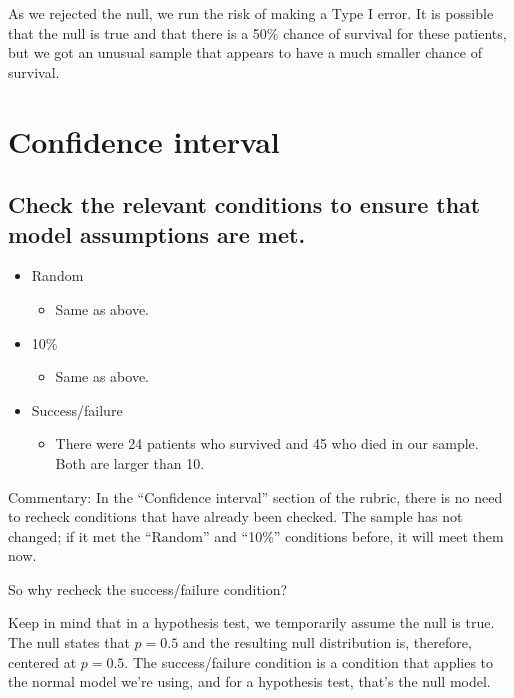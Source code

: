 \documentclass[
]{book}
\providecommand{\tightlist}{%
  \setlength{\itemsep}{0pt}\setlength{\parskip}{0pt}}
\begin{document}
As we rejected the null, we run the risk of making a Type I error. It is possible that the null is true and that there is a 50\% chance of survival for these patients, but we got an unusual sample that appears to have a much smaller chance of survival.

\hypertarget{one-prop-ex-ci}{%
\section{Confidence interval}\label{one-prop-ex-ci}}

\hypertarget{one-prop-ex-ci-conditions}{%
\subsection{Check the relevant conditions to ensure that model assumptions are met.}\label{one-prop-ex-ci-conditions}}

\begin{itemize}
\tightlist
\item
  Random

  \begin{itemize}
  \tightlist
  \item
    Same as above.
  \end{itemize}
\item
  10\%

  \begin{itemize}
  \tightlist
  \item
    Same as above.
  \end{itemize}
\item
  Success/failure

  \begin{itemize}
  \tightlist
  \item
    There were 24 patients who survived and 45 who died in our sample. Both are larger than 10.
  \end{itemize}
\end{itemize}

Commentary: In the ``Confidence interval'' section of the rubric, there is no need to recheck conditions that have already been checked. The sample has not changed; if it met the ``Random'' and ``10\%'' conditions before, it will meet them now.

So why recheck the success/failure condition?

Keep in mind that in a hypothesis test, we temporarily assume the null is true. The null states that \(p = 0.5\) and the resulting null distribution is, therefore, centered at \(p = 0.5\). The success/failure condition is a condition that applies to the normal model we're using, and for a hypothesis test, that's the null model.
\end{document}

